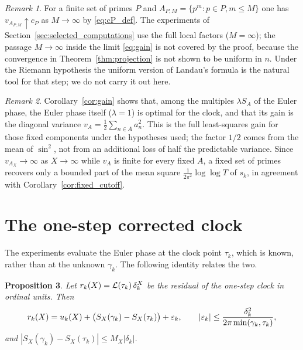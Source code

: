 \documentclass[11pt,reqno]{amsart}
\theoremstyle{plain}\newtheorem{theorem}{Theorem}[section]\newtheorem{proposition}[theorem]{Proposition}\newtheorem{lemma}[theorem]{Lemma}\newtheorem{corollary}[theorem]{Corollary}
\theoremstyle{definition}\newtheorem{hypothesis}[theorem]{Hypothesis}\newtheorem{definition}[theorem]{Definition}
\theoremstyle{remark}\newtheorem{remark}[theorem]{Remark}\newtheorem{experiment}[theorem]{Experiment}\newtheorem{question}[theorem]{Question}\newtheorem{heuristic}[theorem]{Heuristic}\newtheorem{conjecture}[theorem]{Conjecture}
\begin{document}
\begin{remark}\label{rem:gain_full_factors}
For a finite set of primes $P$ and $A_{P,M}=\{p^m:p\in P,m\le M\}$ one has $v_{A_{P,M}}\uparrow c_P$ as $M\to\infty$ by \eqref{eq:cP_def}. The experiments of Section~\ref{sec:selected_computations} use the full local factors ($M=\infty$); the passage $M\to\infty$ inside the limit \eqref{eq:gain} is not covered by the proof, because the convergence in Theorem~\ref{thm:projection} is not shown to be uniform in $n$. Under the Riemann hypothesis the uniform version of Landau's formula \cite{Gonek1993} is the natural tool for that step; we do not carry it out here.
\end{remark}

\begin{remark}\label{rem:gain_meaning}
Corollary~\ref{cor:gain} shows that, among the multiples $\lambda S_A$ of the Euler phase, the Euler phase itself ($\lambda=1$) is optimal for the clock, and that its gain is the diagonal variance $v_A=\frac12\sum_{n\in A}a_n^2$. This is the full least-squares gain for those fixed components under the hypotheses used; the factor $1/2$ comes from the mean of $\sin^2$, not from an additional loss of half the predictable variance. Since $v_{A_X}\to\infty$ as $X\to\infty$ while $v_A$ is finite for every fixed $A$, a fixed set of primes recovers only a bounded part of the mean square $\frac1{2\pi^2}\log\log T$ of $s_k$, in agreement with Corollary~\ref{cor:fixed_cutoff}.
\end{remark}

\section{The one-step corrected clock}
\label{sec:one_step_clock}

The experiments evaluate the Euler phase at the clock point $\tau_k$, which is known, rather than at the unknown $\gamma_k$. The following identity relates the two.

\begin{proposition}\label{prop:one_step_decomposition}
Let $r_k(X)=\mathcal L(\tau_k)\,\delta_k^X$ be the residual of the one-step clock in ordinal units. Then
\begin{equation}
r_k(X)=u_k(X)+\bigl(S_X(\gamma_k)-S_X(\tau_k)\bigr)+\varepsilon_k,\qquad|\varepsilon_k|\le\frac{\delta_k^2}{2\pi\min(\gamma_k,\tau_k)},
\label{eq:one_step_decomposition}
\end{equation}
and $|S_X(\gamma_k)-S_X(\tau_k)|\le M_X|\delta_k|$.
\end{proposition}
\end{document}
